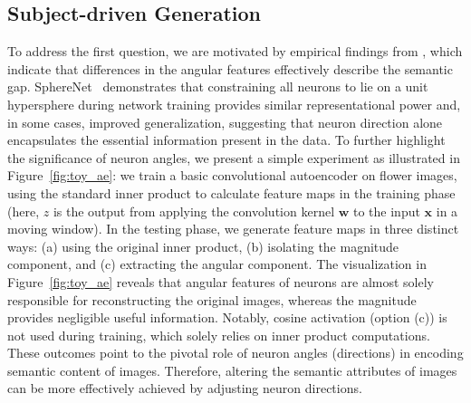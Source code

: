 \begin{itemize}[leftmargin=*,nosep]
\begin{itemize}[leftmargin=*,nosep]
\subsection{Subject-driven Generation}

To address the first question, we are motivated by empirical findings from \cite{liu2018decoupled,chen2020angular}, which indicate that differences in the angular features effectively describe the semantic gap. SphereNet~\cite{liu2017deep} demonstrates that constraining all neurons to lie on a unit hypersphere during network training provides similar representational power and, in some cases, improved generalization, suggesting that neuron direction alone encapsulates the essential information present in the data. To further highlight the significance of neuron angles, we present a simple experiment as illustrated in Figure~\ref{fig:toy_ae}: we train a basic convolutional autoencoder on flower images, using the standard inner product to calculate feature maps in the training phase (here, $z$ is the output from applying the convolution kernel $\bm{w}$ to the input $\bm{x}$ in a moving window). In the testing phase, we generate feature maps in three distinct ways: (a) using the original inner product, (b) isolating the magnitude component, and (c) extracting the angular component. The visualization in Figure~\ref{fig:toy_ae} reveals that angular features of neurons are almost solely responsible for reconstructing the original images, whereas the magnitude provides negligible useful information. Notably, cosine activation (option (c)) is not used during training, which solely relies on inner product computations. These outcomes point to the pivotal role of neuron angles (directions) in encoding semantic content of images. Therefore, altering the semantic attributes of images can be more effectively achieved by adjusting neuron directions.


\end{itemize}
\end{itemize}

